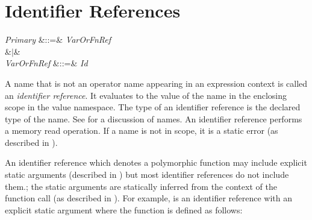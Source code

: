 %
%
%
%

\section{Identifier References}

\begin{Grammar}
\emph{Primary}
&::=& \emph{VarOrFnRef}\\
&$|$&  \\

\emph{VarOrFnRef} &::=& \emph{Id} \\

\end{Grammar}

A name that is not an operator name appearing in an expression context is called
  an \emph{identifier reference}.
It evaluates to the value of the name in the enclosing scope in the value
  namespace.  The type of an identifier reference is the declared type of
  the name.
See  for a discussion of names.
An identifier reference performs a memory read operation.
If a name is not in scope,
it is a static error (as described in ).

An identifier reference which denotes a polymorphic function
may include explicit static arguments
(described in )
but most identifier references do not include them.; the static arguments
are statically inferred from the context of the function call
(as described in ).
For example,
 is an identifier
reference with an explicit static argument where the function
 is defined as follows:


